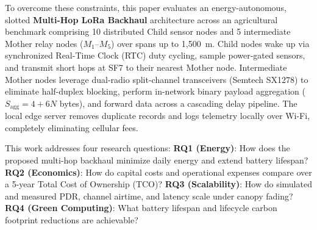 \documentclass[conference]{IEEEtran}
\begin{document}
To overcome these constraints, this paper evaluates an energy-autonomous, slotted \textbf{Multi-Hop LoRa Backhaul} architecture across an agricultural benchmark comprising 10 distributed Child sensor nodes and 5 intermediate Mother relay nodes ($M_1$--$M_5$) over spans up to 1,500~m. Child nodes wake up via synchronized Real-Time Clock (RTC) duty cycling, sample power-gated sensors, and transmit short hops at SF7 to their nearest Mother node. Intermediate Mother nodes leverage dual-radio split-channel transceivers (Semtech SX1278) to eliminate half-duplex blocking, perform in-network binary payload aggregation ($S_{\text{agg}} = 4 + 6N$ bytes), and forward data across a cascading delay pipeline. The local edge server removes duplicate records and logs telemetry locally over Wi-Fi, completely eliminating cellular fees.

This work addresses four research questions: \textbf{RQ1 (Energy)}: How does the proposed multi-hop backhaul minimize daily energy and extend battery lifespan? \textbf{RQ2 (Economics)}: How do capital costs and operational expenses compare over a 5-year Total Cost of Ownership (TCO)? \textbf{RQ3 (Scalability)}: How do simulated and measured PDR, channel airtime, and latency scale under canopy fading? \textbf{RQ4 (Green Computing)}: What battery lifespan and lifecycle carbon footprint reductions are achievable?
\end{document}
